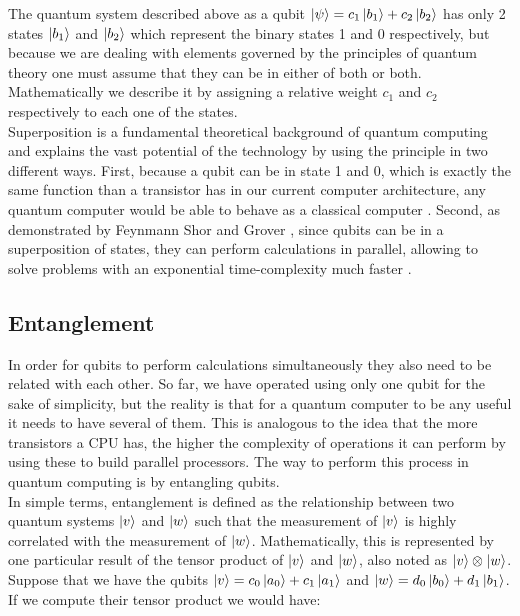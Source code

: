 \documentclass[12pt,a4paper]{scrartcl}
\newcommand{\tens}[1]{%
  \mathbin{\mathop{\otimes}\displaylimits_{#1}}%
}
\begin{document}
The quantum system described above as a qubit $\ket{\psi} = c_1\ket{b_1} + c_2\ket{b_2} $ has only 2 states $\ket{b_1}$ and $\ket{b_2}$ which represent the binary states 1 and 0 respectively, but because we are dealing with elements governed by the principles of quantum theory one must assume that they can be in either of both or both. Mathematically we describe it by assigning a relative weight $c_1$ and $c_2$ respectively to each one of the states. \\

Superposition is a fundamental theoretical background of quantum computing and explains the vast potential of the technology by using the principle in two different ways. First, because a qubit can be in state 1 and 0, which is exactly the same function than a transistor has in our current computer architecture, any quantum computer would be able to behave as a classical computer \cite{bernhardt2019quantum}. Second, as demonstrated by Feynmann \cite{Feynman1982} Shor \cite{Shor1994} and Grover \cite{Grover1996}, since qubits can be in a superposition of states, they can perform calculations in parallel, allowing to solve problems with an exponential time-complexity much faster \cite{DeutschPenrose1985}.  

\subsection{Entanglement}\label{ss:entanglement}
In order for qubits to perform calculations simultaneously they also need to be related with each other. So far, we have operated using only one qubit for the sake of simplicity, but the reality is that for a quantum computer to be any useful it needs to have several of them. This is analogous to the idea that the more transistors a CPU has, the higher the complexity of operations it can perform by using these to build parallel processors. The way to perform this process in quantum computing is by entangling qubits.\\  

In simple terms, entanglement is defined as the relationship between two quantum systems $\ket{v}$ and $\ket{w}$ such that the measurement of $\ket{v}$ is highly correlated with the measurement of $\ket{w}$. Mathematically, this is represented by one particular result of the tensor product of $\ket{v}$ and $\ket{w}$, also noted as $\ket{v} \tens{} \ket{w}$. \\

Suppose that we have the qubits $\ket{v} = c_0\ket{a_0} + c_1\ket{a_1}$ and $\ket{w} = d_0\ket{b_0} + d_1\ket{b_1}$. If we compute their tensor product we would have:
\end{document}
